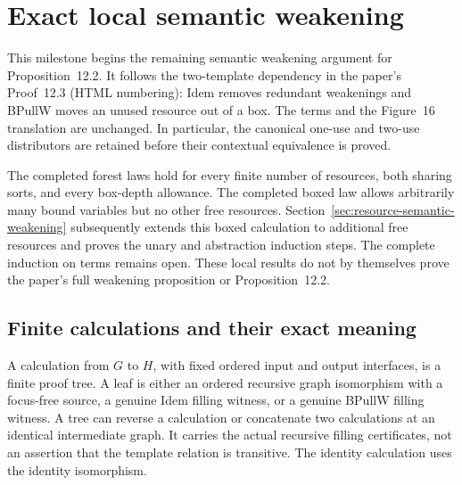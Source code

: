 \clearpage
\section{Exact local semantic weakening}
\label{sec:local-semantic-weakening}
This milestone begins the remaining semantic weakening argument for
Proposition~12.2. It follows the two-template dependency in the paper's
Proof~12.3 (HTML numbering): Idem removes redundant weakenings and BPullW
moves an unused resource out of a box. The terms and the Figure~16 translation
are unchanged. In particular, the canonical one-use and two-use distributors
are retained before their contextual equivalence is proved.

The completed forest laws hold for every finite number of resources, both
sharing sorts, and every box-depth allowance. The completed boxed law allows
arbitrarily many bound variables but no other free resources. Section~\ref{sec:resource-semantic-weakening} subsequently extends this
boxed calculation to additional free resources and proves the unary and
abstraction induction steps. The complete induction on terms remains open. These local results do not by themselves prove the paper's full
weakening proposition or Proposition~12.2.

\subsection{Finite calculations and their exact meaning}
\begin{definition}
A calculation from $G$ to $H$, with fixed ordered input and output interfaces,
is a finite proof tree. A leaf is either an ordered recursive graph
isomorphism with a focus-free source, a genuine Idem filling witness, or a
genuine BPullW filling witness. A tree can reverse a calculation or concatenate
two calculations at an identical intermediate graph. It carries the actual
recursive filling certificates, not an assertion that the template relation
is transitive. The identity calculation uses the identity isomorphism.
\end{definition}

